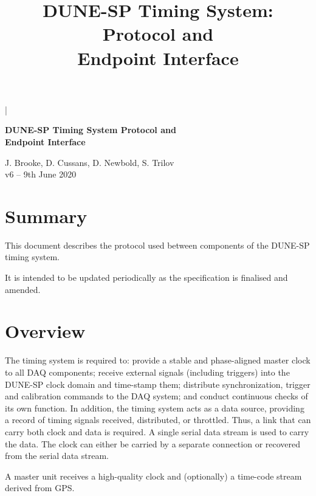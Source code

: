 \documentclass{dune}
\begin{document}

\lstMakeShortInline[columns=fixed]|

\title{DUNE-SP Timing System: Protocol and\\ Endpoint Interface}
\begin{center}
{\LARGE\bf DUNE-SP Timing System Protocol and\\ Endpoint Interface}
\vspace{1cm}

J. Brooke, D. Cussans, D. Newbold, S. Trilov \\
\vspace*{1ex}
v6 -- 9th June 2020
\end{center}
\vspace*{\fill}
\setcounter{tocdepth}{1}
\tableofcontents
\vspace*{\fill}

\section*{Summary}

This document describes the protocol used between components of the DUNE-SP timing system. 

It is intended to be updated periodically as the specification is finalised and amended.

\newpage
\section{Overview}

The timing system is required to: provide a stable and phase-aligned
master clock to all DAQ components; receive external signals (including triggers)
into the DUNE-SP clock domain and time-stamp them; distribute synchronization,
trigger and calibration commands to the DAQ system; and conduct continuous
checks of its own function. In addition, the timing system acts as a
data source, providing a record of timing signals received, distributed, or
throttled. Thus, a link that can carry both clock and data is required. A single serial data stream is used to carry the data. The clock can either be carried by a separate connection or recovered from the serial data stream.

A master unit receives a high-quality clock and (optionally) a time-code stream derived from GPS. 
\end{document}
